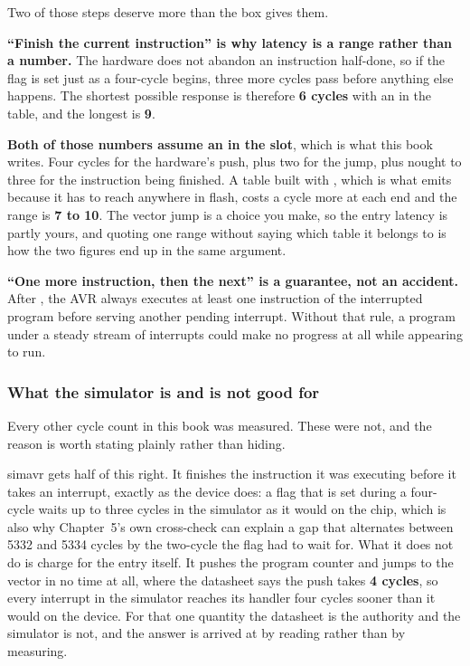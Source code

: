 
Two of those steps deserve more than the box gives them.

\textbf{``Finish the current instruction'' is why latency is a range rather than a number.} The
hardware does not abandon an instruction half-done, so if the flag is set just as a four-cycle
 begins, three more cycles pass before anything else happens. The shortest possible
response is therefore \textbf{6 cycles} with an  in the table, and the longest is
\textbf{9}.

\textbf{Both of those numbers assume an  in the slot}, which is what this book writes.
Four cycles for the hardware's push, plus two for the jump, plus nought to three for the
instruction being finished. A table built with , which is what  emits
because it has to reach anywhere in flash, costs a cycle more at each end and the range is
\textbf{7 to 10}. The vector jump is a choice you make, so the entry latency is partly yours, and
quoting one range without saying which table it belongs to is how the two figures end up in the
same argument.

\textbf{``One more instruction, then the next'' is a guarantee, not an accident.} After
, the AVR always executes at least one instruction of the interrupted program before
serving another pending interrupt. Without that rule, a program under a steady stream of
interrupts could make no progress at all while appearing to run.

\subsubsection{What the simulator is and is not good for}
Every other cycle count in this book was measured. These were not, and the reason is worth
stating plainly rather than hiding.

simavr gets half of this right. It finishes the instruction it was executing before it takes an
interrupt, exactly as the device does: a flag that is set during a four-cycle  waits up
to three cycles in the simulator as it would on the chip, which is also why Chapter~5's own
cross-check can explain a gap that alternates between 5332 and 5334 cycles by the two-cycle
 the flag had to wait for. What it does not do is charge for the entry itself. It
pushes the program counter and jumps to the vector in no time at all, where the datasheet says the
push takes \textbf{4 cycles}, so every interrupt in the simulator reaches its handler four cycles
sooner than it would on the device. For that one quantity the datasheet is the authority and the
simulator is not, and the answer is arrived at by reading rather than by measuring.

